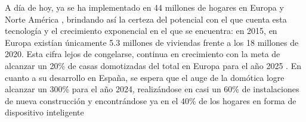 A día de hoy, ya se ha implementado en 44 millones de hogares en Europa y Norte América \cite{HT:2014}, brindando así la certeza del potencial con el que cuenta esta tecnología y el crecimiento exponencial en el que se encuentra: en 2015, en Europa existían únicamente 5.3 millones de viviendas frente a los 18 millones de 2020. Esta cifra lejos de congelarse, continua en crecimiento con la meta de alcanzar un 20\% de casas domotizadas del total en Europa para el año 2025 \cite{Berg:2020}. En cuanto a su desarrollo en España, se espera que el auge de la domótica logre alcanzar un 300\% para el año 2024, realizándose en casi un 60\% de instalaciones de nueva construcción \cite{Portal:2020} y encontrándose ya en el 40\% de los hogares en forma de dispositivo inteligente

